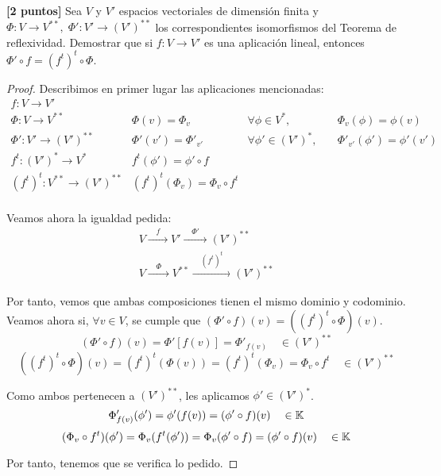 \documentclass[12pt]{article}
\begin{document}
\begin{ejercicio}\textbf{[2 puntos]}
    Sea $V$ y $V'$ espacios vectoriales de dimensión finita y $\Phi:V\to V^{\ast\ast},\; \Phi':V'\to (V')^{\ast\ast}$ los correspondientes isomorfismos del Teorema de reflexividad. Demostrar que si $f:V\to V'$ es una aplicación lineal, entonces $\Phi'\circ f = (f^t)^t \circ \Phi$.

    \begin{proof}
        Describimos en primer lugar las aplicaciones mencionadas:
        \begin{equation*}\begin{array}{llll}
            f:V\to V' &&&\\
            \Phi:V\to V^{\ast\ast} & \Phi(v)=\Phi_v & \forall \phi\in V^\ast,\quad &\Phi_v(\phi)=\phi(v) \\
            \Phi':V'\to (V')^{\ast\ast} & \Phi'(v')=\Phi'_{v'} & \forall \phi'\in (V')^\ast,\quad &\Phi'_{v'}(\phi')=\phi'(v') \\
            f^t:(V')^\ast \to V^\ast & f^t(\phi')=\phi'\circ f &&\\
            (f^t)^t:V^{\ast\ast} \to (V')^{\ast\ast} & (f^t)^t(\Phi_v)=\Phi_v\circ f^t &&\\
        \end{array}\end{equation*}
    
        Veamos ahora la igualdad pedida:
        \begin{gather*}
            V\xrightarrow{\quad f \quad} V' \xrightarrow{\quad \Phi' \quad} (V')^{\ast\ast}\\
            V\xrightarrow{\quad \Phi \quad} V^{\ast\ast} \xrightarrow{\quad (f^t)^t \quad} (V')^{\ast\ast}
        \end{gather*}
    
        Por tanto, vemos que ambas composiciones tienen el mismo dominio y codominio. Veamos ahora si, $\forall v\in V$, se cumple que $(\Phi'\circ f)(v) = ((f^t)^t \circ \Phi)(v)$.
        \begin{equation*}
            (\Phi'\circ f)(v) = \Phi'[f(v)] = \Phi'_{f(v)} \quad  \in (V')^{\ast\ast}
        \end{equation*}
        \begin{equation*}
            ((f^t)^t \circ \Phi)(v) = (f^t)^t(\Phi(v)) = (f^t)^t(\Phi_v) = \Phi_v\circ f^t \quad \in (V')^{\ast\ast}
        \end{equation*}
    
        Como ambos pertenecen a $(V')^{\ast\ast}$, les aplicamos $\phi'\in (V')^\ast$.
        \begin{equation*}
            \Phi'_{f(v)}(\phi') = \phi'(f(v)) = (\phi' \circ f)(v) \quad \in \mathbb{K}
        \end{equation*}
        \begin{equation*}
            (\Phi_v\circ f^t)(\phi') = \Phi_v(f^t(\phi')) = \Phi_v(\phi'\circ f) = (\phi'\circ f)(v) \quad \in \mathbb{K}
        \end{equation*}
    
        Por tanto, tenemos que se verifica lo pedido.
        \end{proof}
\end{ejercicio}
\end{document}
